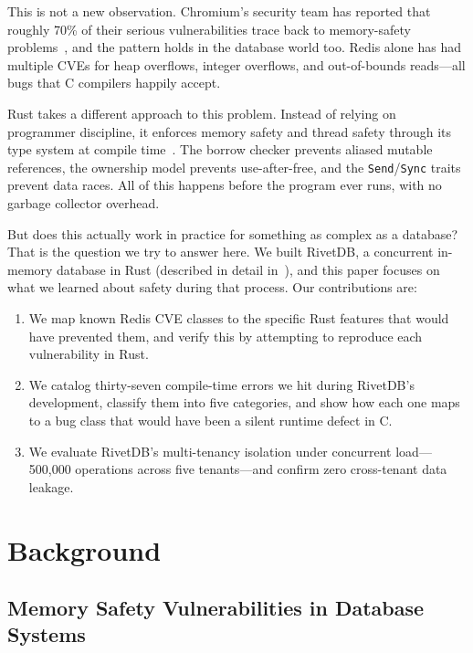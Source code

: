 \documentclass[conference,a4paper]{IEEEtran}
\begin{document}
This is not a new observation. Chromium's security team has reported that roughly 70\% of their serious vulnerabilities trace back to memory-safety problems~\cite{chromium2024}, and the pattern holds in the database world too. Redis alone has had multiple CVEs for heap overflows, integer overflows, and out-of-bounds reads---all bugs that C compilers happily accept.

Rust takes a different approach to this problem. Instead of relying on programmer discipline, it enforces memory safety and thread safety through its type system at compile time~\cite{matsakis2014}. The borrow checker prevents aliased mutable references, the ownership model prevents use-after-free, and the \texttt{Send}/\texttt{Sync} traits prevent data races. All of this happens before the program ever runs, with no garbage collector overhead.

But does this actually work in practice for something as complex as a database? That is the question we try to answer here. We built RivetDB, a concurrent in-memory database in Rust (described in detail in~\cite{shimpi2026rivetdb}), and this paper focuses on what we learned about safety during that process. Our contributions are:

\begin{enumerate}
    \item We map known Redis CVE classes to the specific Rust features that would have prevented them, and verify this by attempting to reproduce each vulnerability in Rust.
    \item We catalog thirty-seven compile-time errors we hit during RivetDB's development, classify them into five categories, and show how each one maps to a bug class that would have been a silent runtime defect in C.
    \item We evaluate RivetDB's multi-tenancy isolation under concurrent load---500,000 operations across five tenants---and confirm zero cross-tenant data leakage.
\end{enumerate}

\section{Background}

\subsection{Memory Safety Vulnerabilities in Database Systems}
\end{document}
